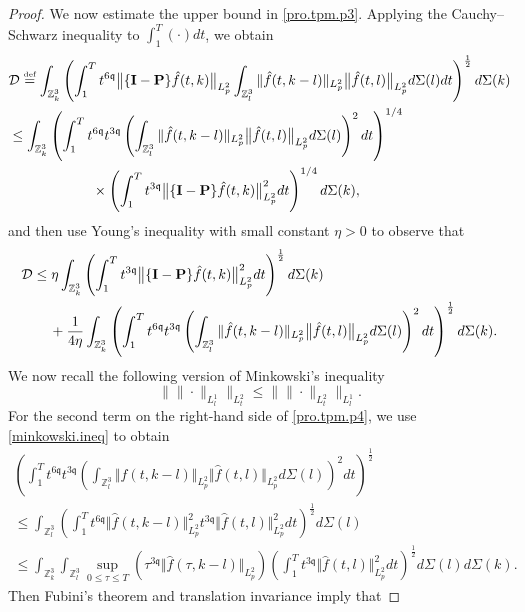 \documentclass[reqno]{amsart}
\newcommand{\eqdef }{\overset{\mbox{\tiny{def}}}{=}}
\newcommand{\pv}{p}
\def\norm#1{\big\Vert#1\big\Vert}
\newcommand{\qq}{\mathfrak{q}}
\newcommand{\tTq}{t^{3\qq}}
\newcommand{\tQQq}{t^{6\qq}}
\newcommand{\micro}{{\bf \{I- P\}}}
\newcommand{\Z}{\mathbb{Z}}
\theoremstyle{definition}
\numberwithin{equation}{section}
\numberwithin{theorem}{section}
\begin{document}
\begin{proof}
We now estimate the upper bound in \eqref{pro.tpm.p3}. Applying the Cauchy--Schwarz inequality to $\int_{1}^{T}(\cdot)dt$, we obtain
\begin{align}
&\mathcal{D}\eqdef\int_{\Z^3_k}\left(\int^{T}_{1} \tQQq\norm{\micro\hat{f}(t,k)}_{L^2_{\pv}}\int_{\Z^3_l}\Vert \hat{f}(t,k-l)\Vert_{L^2_{\pv}} \norm{\hat{f}(t,l)}_{L^2_{\pv}}  d\Sigma(l)dt\right)^{\frac12}d\Sigma(k)
\notag
\\
&\leq \int_{\Z^3_k} \left(\int^{T}_{1} \tQQq \tTq\left(\int_{\Z^3_l} \Vert \hat{f}(t,k-l)\Vert_{L^2_{\pv}} \norm{\hat{f}(t,l)}_{L^2_{\pv}}d\Sigma(l)\right)^2dt\right)^{1/4}
\notag
\\
&\qquad\qquad\qquad\times \left(\int^{T}_{1} \tTq\norm{\micro\hat{f}(t,k)}_{L^2_{\pv}}^2 dt\right)^{1/4} d\Sigma(k),
\notag
\end{align}
and then  use Young's inequality with  small constant $\eta>0$ to observe that
\begin{align}
&\mathcal{D}\leq \eta\int_{\Z^3_k}\left(\int^{T}_{1} \tTq\norm{\micro\hat{f}(t,k)}_{L^2_{\pv}}^2 dt\right)^{\frac12}d\Sigma(k)
\label{pro.tpm.p4}
\\ \notag
&\qquad+\frac{1}{4\eta} \int_{\Z^3_k}\left(\int^{T}_{1} \tQQq \tTq\left(\int_{\Z^3_l} \Vert \hat{f}(t,k-l)\Vert_{L^2_{\pv}} \norm{\hat{f}(t,l)}_{L^2_{\pv}}d\Sigma(l)\right)^2dt\right)^{\frac12} d\Sigma(k).
\end{align}
We now recall the following version of Minkowski's inequality 
\begin{equation}\label{minkowski.ineq}
\big\|\|\cdot\|_{L^1_l}\big\|_{L^2_t}\leq \big\|\|\cdot\|_{L^2_t}\big\|_{L^1_l}.
\end{equation}
For the second term on the right-hand side of \eqref{pro.tpm.p4},
we use \eqref{minkowski.ineq} to obtain
\begin{multline*}
\left(\int^{T}_{1} \tQQq \tTq\left(\int_{\Z^3_l} \Vert \hat{f}(t,k-l)\Vert_{L^2_{\pv}} \norm{\hat{f}(t,l)}_{L^2_{\pv}}d\Sigma(l)\right)^2dt\right)^{\frac12}
\\
\leq
\int_{\Z^3_l} \left(\int^{T}_{1} \tQQq \Vert \hat{f}(t,k-l)\Vert_{L^2_{\pv}}^2 \tTq\norm{\hat{f}(t,l)}_{L^2_{\pv}}^2 dt\right)^{\frac12}d\Sigma(l)
\\
\leq 
\int_{\Z^3_k} \int_{\Z^3_l} \sup_{0\le \tau\le T} \left( \tau^{3\qq}\Vert \hat{f}(\tau,k-l) \Vert_{L^2_{\pv}}\right) \left(\int^{T}_{1} \tTq\norm{\hat{f}(t,l)}_{L^2_{\pv}}^2 dt\right)^{\frac12}d\Sigma(l) d\Sigma(k).
\end{multline*}
Then Fubini's theorem and translation invariance imply that

\end{proof}
\end{document}
